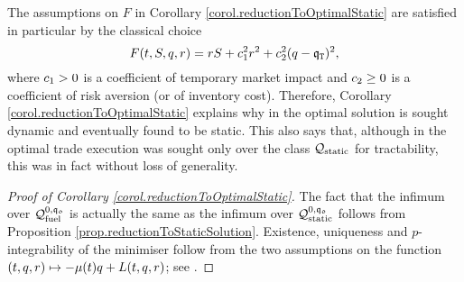 \documentclass[10pt,a4paper]{article}
\begin{document}
\begin{remark}\label{remark.reductionToStaticSolutionInCarteaTextbook}
The assumptions on $F$ in Corollary \ref{corol.reductionToOptimalStatic} are satisfied in particular by the classical choice 
\begin{equation}\label{eq.classicalLagrangianWithLinearTemporaryImpact}
F(t,S, q,r)
=rS + c_{1}^{2}  r^{2} + c_{2}^{2} ( q - \mathfrak{q}_{\mathtt{T} })^{2} ,
\end{equation}
where $c_{1}>0$ is a coefficient of temporary market impact and $c_{2}\geq 0 $ is a coefficient of risk aversion (or of inventory cost). Therefore, Corollary \ref{corol.reductionToOptimalStatic} explains why in \cite[Section 6.3]{CJP15alg} the optimal solution is sought dynamic and eventually found to be static. This also says that, although in \cite{AC00opt} the optimal trade execution was sought only over the class $\mathcal{Q}_{\text{static}}$ for tractability, this was in fact without loss of generality.
\end{remark}

\begin{proof}[Proof of Corollary \ref{corol.reductionToOptimalStatic}]
The fact that the infimum over $\mathcal{Q}_{\text{fuel}}^{0,\mathfrak{q_0}}$ is actually the same as the infimum over $\mathcal{Q}_{\text{static}}^{0,\mathfrak{q_0}}$ follows from Proposition \ref{prop.reductionToStaticSolution}.  Existence, uniqueness and $p$-integrability of the minimiser follow from the two assumptions on the function $(t,q,r) \mapsto -\mu(t)q +L(t,q,r)$; see \cite[Theorem 4.1]{Dac08dir}.
\end{proof}
\end{document}
